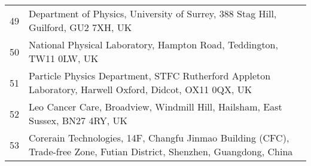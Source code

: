 {\begin{tabular}{ c p{15cm} }
     49 & Department of Physics, University of Surrey, 388 Stag Hill, Guilford, GU2 7XH, UK\\
     50 & National Physical Laboratory, Hampton Road, Teddington, TW11 0LW, UK\\
     51 & Particle Physics Department, STFC Rutherford Appleton Laboratory, Harwell Oxford, Didcot, OX11 0QX, UK\\
     52 & Leo Cancer Care, Broadview, Windmill Hill, Hailsham, East Sussex, BN27 4RY, UK\\
     53 & Corerain Technologies, 14F, Changfu Jinmao Building (CFC), Trade-free Zone, Futian District, Shenzhen, Guangdong, China\\
  \end{tabular}
}

